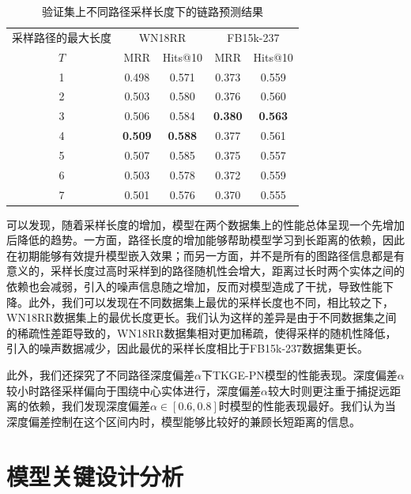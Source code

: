 \begin{table}[htbp]
    \begin{center}
        \caption{验证集上不同路径采样长度下的链路预测结果}
        \renewcommand{\arraystretch}{1.5}
        \begin{tabular}{*{5}{c}}
            \toprule
            采样路径的最大长度& \multicolumn{2}{c}{WN18RR} & \multicolumn{2}{c}{FB15k-237}\\
            \cmidrule(lr){2-3}\cmidrule(lr){4-5}
            $T$&MRR&Hits@10&MRR&Hits@10\\
            \midrule
            1	&0.498&0.571&0.373&0.559\\
            2	&0.503&0.580&0.376&0.560\\
            3	&0.506&0.584&\textbf{0.380}&\textbf{0.563}\\
            4	&\textbf{0.509}&\textbf{0.588}&0.377&0.561\\
            5	&0.507&0.585&0.375&0.557\\
            6	&0.503&0.578&0.372&0.559\\
            7	&0.501&0.576&0.370&0.555\\
            \bottomrule
        \end{tabular}
        \label{length_tab}
    \end{center}
\end{table}
  
可以发现，随着采样长度的增加，模型在两个数据集上的性能总体呈现一个先增加后降低的趋势。一方面，路径长度的增加能够帮助模型学习到长距离的依赖，因此在初期能够有效提升模型嵌入效果；而另一方面，并不是所有的图路径信息都是有意义的，采样长度过高时采样到的路径随机性会增大，距离过长时两个实体之间的依赖也会减弱，引入的噪声信息随之增加，反而对模型造成了干扰，导致性能下降。此外，我们可以发现在不同数据集上最优的采样长度也不同，相比较之下，WN18RR数据集上的最优长度更长。我们认为这样的差异是由于不同数据集之间的稀疏性差距导致的，WN18RR数据集相对更加稀疏，使得采样的随机性降低，引入的噪声数据减少，因此最优的采样长度相比于FB15k-237数据集更长。

此外，我们还探究了不同路径深度偏差$\alpha$下TKGE-PN模型的性能表现。深度偏差$\alpha$较小时路径采样偏向于围绕中心实体进行，深度偏差$\alpha$较大时则更注重于捕捉远距离的依赖，我们发现深度偏差$\alpha\in\left[0.6,0.8\right] $时模型的性能表现最好。我们认为当深度偏差控制在这个区间内时，模型能够比较好的兼顾长短距离的信息。

\section{模型关键设计分析}

